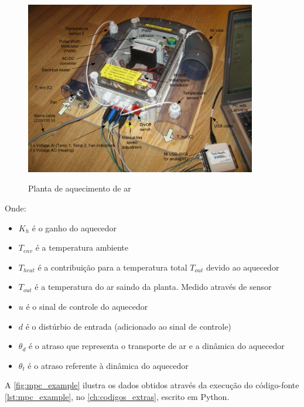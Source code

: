 \begin{figure}
    \caption{Planta de aquecimento de ar}
	\begin{center}
        \includegraphics[width=0.9\textwidth]{./5_images/Finn_AirHeater.png} 
		\label{fig:mpc_example_plant}
	\end{center}
    \centering
\end{figure}

\noindent
Onde: 
\begin{itemize}
	\item $K_h$ é o ganho do aquecedor
	\item $T_{env}$ é a temperatura ambiente
	\item $T_{heat}$ é a contribuição para a temperatura total $T_{out}$ devido ao aquecedor
	\item $T_{out}$ é a temperatura do ar saindo da planta. Medido através de sensor
	\item $u$ é o sinal de controle do aquecedor
	\item $d$ é o distúrbio de entrada (adicionado ao sinal de controle)
	\item ${\theta}_d$ é o atraso que representa o transporte de ar e a dinâmica do aquecedor
	\item ${\theta}_t$ é o atraso referente à dinâmica do aquecedor
\end{itemize}

A \cref{fig:mpc_example} ilustra os dados obtidos através da execução do código-fonte \ref{lst:mpc_example},
no \cref{ch:codigos_extras}, escrito em Python.

